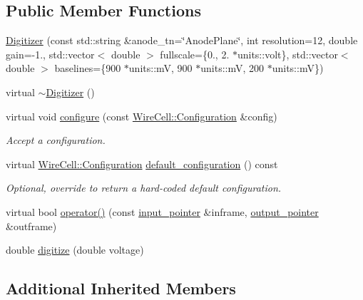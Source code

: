 \subsection*{Public Member Functions}
\begin{DoxyCompactItemize}
\item 
\hyperlink{class_wire_cell_1_1_gen_1_1_digitizer_aee4cf08d87691932751e7eb8a5a9559d}{Digitizer} (const std\+::string \&anode\+\_\+tn=\char`\"{}Anode\+Plane\char`\"{}, int resolution=12, double gain=-\/1., std\+::vector$<$ double $>$ fullscale=\{0., 2. $\ast$units\+::volt\}, std\+::vector$<$ double $>$ baselines=\{900 $\ast$units\+::mV, 900 $\ast$units\+::mV, 200 $\ast$units\+::mV\})
\item 
virtual \hyperlink{class_wire_cell_1_1_gen_1_1_digitizer_a2f927b1818c23d7719b1ad4ec5d76a3e}{$\sim$\+Digitizer} ()
\item 
virtual void \hyperlink{class_wire_cell_1_1_gen_1_1_digitizer_aca2a5cb3a51bcb3fb147456f3542babe}{configure} (const \hyperlink{namespace_wire_cell_a9f705541fc1d46c608b3d32c182333ee}{Wire\+Cell\+::\+Configuration} \&config)
\begin{DoxyCompactList}\small\item\em Accept a configuration. \end{DoxyCompactList}\item 
virtual \hyperlink{namespace_wire_cell_a9f705541fc1d46c608b3d32c182333ee}{Wire\+Cell\+::\+Configuration} \hyperlink{class_wire_cell_1_1_gen_1_1_digitizer_a6f8c0cf139021b7b54162e1dc42d9668}{default\+\_\+configuration} () const
\begin{DoxyCompactList}\small\item\em Optional, override to return a hard-\/coded default configuration. \end{DoxyCompactList}\item 
virtual bool \hyperlink{class_wire_cell_1_1_gen_1_1_digitizer_a06ba39eb87a8acb50a3311f290d814a4}{operator()} (const \hyperlink{class_wire_cell_1_1_i_function_node_a55c0946156df9b712b8ad1a0b59b2db6}{input\+\_\+pointer} \&inframe, \hyperlink{class_wire_cell_1_1_i_function_node_afc02f1ec60d31aacddf64963f9ca650b}{output\+\_\+pointer} \&outframe)
\item 
double \hyperlink{class_wire_cell_1_1_gen_1_1_digitizer_a0280442eb3c74a29e73899d976aa83f6}{digitize} (double voltage)
\end{DoxyCompactItemize}
\subsection*{Additional Inherited Members}


